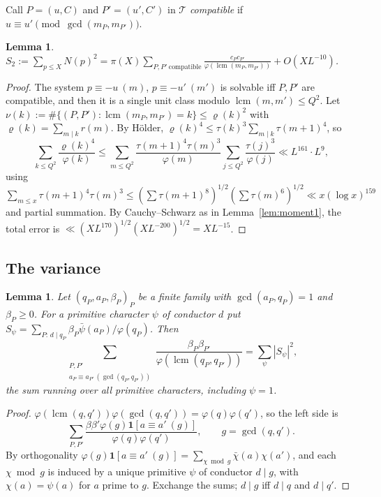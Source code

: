 \documentclass[11pt,reqno]{amsart}
\newtheorem{lemma}[theorem]{Lemma}
\theoremstyle{definition}
\newcommand{\cT}{\mathcal T}
\DeclareMathOperator{\lcm}{lcm}
\begin{document}
Call $P=(u,C)$ and $P'=(u',C')$ in $\cT$ \emph{compatible} if $u\equiv
u'\pmod{\gcd(m_P,m_{P'})}$.

\begin{lemma}\label{lem:moment2}
$S_2:=\sum_{p\le X}N(p)^2=\pi(X)\sum_{P,P'\ \mathrm{compatible}}
\frac{c_Pc_{P'}}{\varphi(\lcm(m_P,m_{P'}))}+O(XL^{-10})$.
\end{lemma}
\begin{proof}
The system $p\equiv-u\ (m)$, $p\equiv-u'\ (m')$ is solvable iff $P,P'$ are
compatible, and then it is a single unit class modulo $\lcm(m,m')\le
Q^2$.  Let $\nu(k):=\#\{(P,P'):\lcm(m_P,m_{P'})=k\}\le\varrho(k)^2$ with
$\varrho(k)=\sum_{m\mid k}r(m)$.  By H\"older,
$\varrho(k)^4\le\tau(k)^3\sum_{m\mid k}\tau(m+1)^4$, so
\[
 \sum_{k\le Q^2}\frac{\varrho(k)^4}{\varphi(k)}\le
 \sum_{m\le Q^2}\frac{\tau(m+1)^4\tau(m)^3}{\varphi(m)}
 \sum_{j\le Q^2}\frac{\tau(j)^3}{\varphi(j)}\ll L^{161}\cdot L^9,
\]
using $\sum_{m\le x}\tau(m+1)^4\tau(m)^3\le(\sum\tau(m+1)^8)^{1/2}(\sum\tau(m)^6)^{1/2}
\ll x(\log x)^{159}$ and partial summation.  By Cauchy--Schwarz as in
Lemma~\ref{lem:moment1}, the total error is
$\ll(XL^{170})^{1/2}(XL^{-200})^{1/2}=XL^{-15}$.
\end{proof}

\subsection{The variance}
\begin{lemma}\label{lem:varid}
Let $(q_P,a_P,\beta_P)_{P}$ be a finite family with $\gcd(a_P,q_P)=1$ and
$\beta_P\ge0$.  For a primitive character $\psi$ of conductor $d$ put
$S_\psi=\sum_{P:\,d\mid q_P}\beta_P\bar\psi(a_P)/\varphi(q_P)$.  Then
\[
 \sum_{\substack{P,P'\\ a_P\equiv a_{P'}\,(\gcd(q_P,q_{P'}))}}\frac{\beta_P\beta_{P'}}{\varphi(\lcm(q_P,q_{P'}))}
 =\sum_\psi|S_\psi|^2,
\]
the sum running over all primitive characters, including $\psi=1$.
\end{lemma}
\begin{proof}
$\varphi(\lcm(q,q'))\varphi(\gcd(q,q'))=\varphi(q)\varphi(q')$, so the left
side is
\[
 \sum_{P,P'}\frac{\beta\beta'\varphi(g)\mathbf 1[a\equiv a'\ (g)]}{\varphi(q)\varphi(q')},
 \qquad g=\gcd(q,q').
\]  By orthogonality
$\varphi(g)\mathbf 1[a\equiv a'\ (g)]=\sum_{\chi\bmod g}\bar\chi(a)\chi(a')$,
and each $\chi\bmod g$ is induced by a unique primitive $\psi$ of
conductor $d\mid g$, with $\chi(a)=\psi(a)$ for $a$ prime to $g$.  Exchange
the sums; $d\mid g$ iff $d\mid q$ and $d\mid q'$.
\end{proof}
\end{document}
